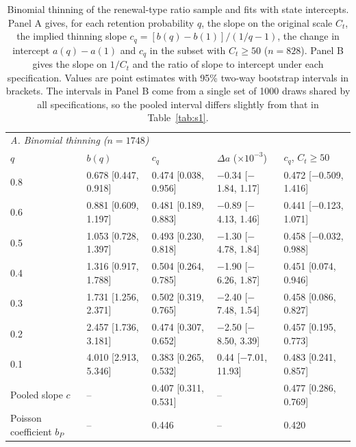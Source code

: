 \begin{table}[htbp]
\centering
\footnotesize
\setlength{\tabcolsep}{4pt}
\caption{Binomial thinning of the renewal-type ratio sample and fits with state intercepts. Panel A gives, for each retention probability $q$, the slope on the original scale $C_t$, the implied thinning slope $c_q=[b(q)-b(1)]/(1/q-1)$, the change in intercept $a(q)-a(1)$ and $c_q$ in the subset with $C_t\ge50$ ($n=828$). Panel B gives the slope on $1/C_t$ and the ratio of slope to intercept under each specification. Values are point estimates with 95\% two-way bootstrap intervals in brackets. The intervals in Panel B come from a single set of 1000 draws shared by all specifications, so the pooled interval differs slightly from that in Table~\ref{tab:s1}.}
\label{tab:s11}
\begin{tabular}{lllll}
\toprule
\multicolumn{5}{l}{\textit{A. Binomial thinning ($n=1748$)}}\\
$q$ & $b(q)$ & $c_q$ & $\Delta a$ ($\times10^{-3}$) & $c_q$, $C_t\ge50$ \\
\midrule
0.8 & 0.678 [0.447, 0.918] & 0.474 [0.038, 0.956] & $-$0.34 [$-$1.84, 1.17] & 0.472 [$-$0.509, 1.416] \\
0.6 & 0.881 [0.609, 1.197] & 0.481 [0.189, 0.883] & $-$0.89 [$-$4.13, 1.46] & 0.441 [$-$0.123, 1.071] \\
0.5 & 1.053 [0.728, 1.397] & 0.493 [0.230, 0.818] & $-$1.30 [$-$4.78, 1.84] & 0.458 [$-$0.032, 0.988] \\
0.4 & 1.316 [0.917, 1.788] & 0.504 [0.264, 0.785] & $-$1.90 [$-$6.26, 1.87] & 0.451 [0.074, 0.946] \\
0.3 & 1.731 [1.256, 2.371] & 0.502 [0.319, 0.765] & $-$2.40 [$-$7.48, 1.54] & 0.458 [0.086, 0.827] \\
0.2 & 2.457 [1.736, 3.181] & 0.474 [0.307, 0.652] & $-$2.50 [$-$8.50, 3.39] & 0.457 [0.195, 0.773] \\
0.1 & 4.010 [2.913, 5.346] & 0.383 [0.265, 0.532] & 0.44 [$-$7.01, 11.93] & 0.483 [0.241, 0.857] \\
\midrule
Pooled slope $c$ & -- & 0.407 [0.311, 0.531] & -- & 0.477 [0.286, 0.769] \\
Poisson coefficient $b_P$ & -- & 0.446 & -- & 0.420 \\
\bottomrule
\end{tabular}


\end{table}
